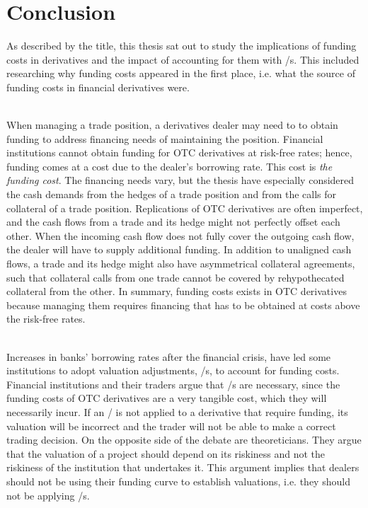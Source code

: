 \documentclass[main.tex]{subfiles}
\begin{document}
    \section{Conclusion}

    As described by the title, this thesis sat out to study the implications
    of funding costs in derivatives and the impact of accounting for them with \FVA/s.
    This included researching why funding costs appeared in the first place,
    i.e. what the source of funding costs in financial derivatives were.
    
    \textbf{\researchQuestionFundingCosts}\\
    When managing a trade position, a derivatives dealer may need to to obtain funding 
    to address financing needs of maintaining the position.
    Financial institutions cannot obtain funding for OTC derivatives at risk-free rates;
    hence, funding comes at a cost due to the dealer's borrowing rate.
    This cost is \textit{the funding cost}.
    The financing needs vary, but the thesis have especially considered
    the cash demands from the hedges of a trade position
    and from the calls for collateral of a trade position.
    Replications of OTC derivatives are often imperfect,
    and the cash flows from a trade and its hedge might not perfectly offset each other.
    When the incoming cash flow does not fully cover the outgoing cash flow,
    the dealer will have to supply additional funding.
    In addition to unaligned cash flows, 
    a trade and its hedge might also have asymmetrical collateral agreements,
    such that collateral calls from one trade cannot be covered by rehypothecated collateral from the other.
    In summary, funding costs exists in OTC derivatives
    because managing them requires financing 
    that has to be obtained at costs above the risk-free rates.

    \textbf{\researchQuestionFvaDebate}\\
    Increases in banks' borrowing rates after the financial crisis,
    have led some institutions to adopt valuation adjustments, \FVA/s, to account for funding costs.
    Financial institutions and their traders argue that \FVA/s are necessary,
    since the funding costs of OTC derivatives are a very tangible cost,
    which they will necessarily incur.
    If an \FVA/ is not applied to a derivative that require funding,
    its valuation will be incorrect and the trader will not be able to make a correct trading decision.
    On the opposite side of the debate are theoreticians.
    They argue that the valuation of a project should depend on its riskiness
    and not the riskiness of the institution that undertakes it.
    This argument implies that dealers should not be using their funding curve to establish 
    valuations, i.e. they should not be applying \FVA/s.
\end{document}
